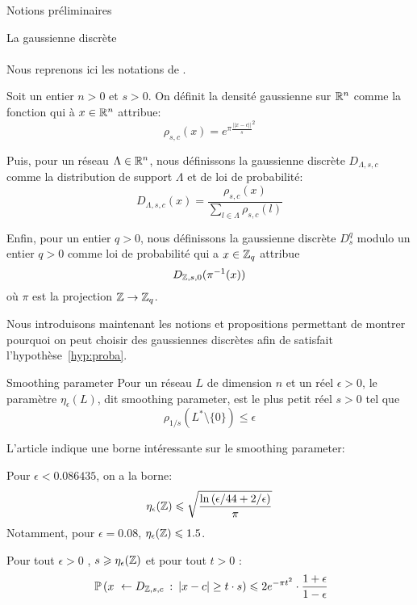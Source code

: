 \begin{section}{Notions préliminaires}
\begin{subsection}{La gaussienne discrète}
	\paragraph{}
Nous reprenons ici les notations de \cite{STOC:GenPeiVai08}.

Soit un entier $n > 0$  et $s > 0$. On définit la densité gaussienne sur $\mathbb{R}^n$ comme la fonction qui à $x\in\mathbb{R}^n$
attribue:
\[\rho_{s,c}(x) = e^{\pi {\frac{||x-c||}{s}}^2} \]

Puis, pour un réseau $\Lambda \in \mathbb{R}^n$, nous définissons la gaussienne discrète $D_{\Lambda,s,c}$ comme la
distribution de support $\Lambda$ et de loi de probabilité: 	
\[ D_{\Lambda, s, c}(x) = \frac{\rho_{s,c}(x)}{\sum_{l\in \Lambda}\rho_{s,c}(l)}\]

Enfin, pour un entier $q > 0$, nous définissons la gaussienne discrète $D^q_{s}$ modulo un entier $q > 0$ comme loi de
probabilité qui a $x \in \mathbb{Z}_q$ attribue 
	\[ D_{\mathbb{Z}, s, 0}(\pi^{-1}(x)) \]
où $\pi$ est la projection $\mathbb{Z} \rightarrow \mathbb{Z}_q$.


Nous introduisons maintenant les notions et propositions permettant de montrer pourquoi on peut choisir 
des gaussiennes discrètes afin de satisfait l'hypothèse~\ref{hyp:proba}.

\begin{definition}{Smoothing parameter}
Pour un réseau $L$ de dimension $n$ et un réel $\epsilon > 0$, le paramètre $\eta_\epsilon(L)$, dit smoothing parameter,
est le plus petit réel $s>0$ tel que 
	\[\rho_{1/s}(L^* \setminus \{0\}) \leqslant \epsilon\]
\end{definition}

L'article \cite{cryptoeprint:2018:786} indique une borne intéressante sur le smoothing parameter:
\begin{prop}
Pour $\epsilon < 0.086435$, on a la borne:
\[\eta_{\epsilon}(\mathbb{Z})  \leqslant \sqrt{\frac{\ln\left(\epsilon/44 + 2/\epsilon\right)}{\pi}} \]
Notamment, pour $\epsilon = 0.08$, $\eta_\epsilon(\mathbb{Z}) \leqslant 1.5$.
\end{prop}

\begin{prop}
\label{gaussienne}
Pour tout $\epsilon > 0$ , $s \geqslant \eta_{\epsilon}(\mathbb{Z})$ et pour tout $t>0$ :
\[ \PP\left(x \leftarrow D_{\ZZ, s,c}\: :\: |x-c| \geq t\cdot s\right) \leqslant 2 e^{-\pi t^2}	\cdot \frac{1+\epsilon}{1-\epsilon} \]
\end{prop}


\end{subsection}
\end{section}
